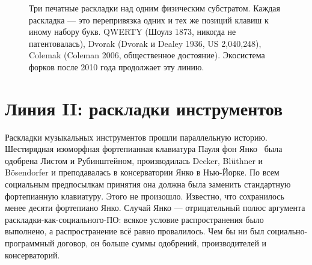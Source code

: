 \documentclass[10pt,letterpaper,twocolumn]{article}
\begin{document}
\begin{figure}[t]
\centering
{}
\caption{Три печатные раскладки над одним физическим субстратом. Каждая раскладка --- это перепривязка одних и тех же позиций клавиш к иному набору букв. QWERTY (Шоулз 1873, никогда не патентовалась), Dvorak (Dvorak и Dealey 1936, US 2{,}040{,}248), Colemak (Coleman 2006, общественное достояние). Экосистема форков после 2010 года продолжает эту линию.}
\label{fig:typing-layouts}
\end{figure}

\section{Линия II: раскладки инструментов}
\label{sec:lineage2}

Раскладки музыкальных инструментов прошли параллельную историю. Шестирядная изоморфная фортепианная клавиатура Пауля фон Янко~\citep{janko1882} была одобрена Листом и Рубинштейном, производилась Decker, Blüthner и Bösendorfer и преподавалась в консерватории Янко в Нью-Йорке. По всем социальным предпосылкам принятия она должна была заменить стандартную фортепианную клавиатуру. Этого не произошло. Известно, что сохранилось менее десяти фортепиано Янко. Случай Янко --- отрицательный полюс аргумента раскладки-как-социального-ПО: всякое условие распространения было выполнено, а распространение всё равно провалилось. Чем бы ни был социально-программный договор, он больше суммы одобрений, производителей и консерваторий.
\end{document}
